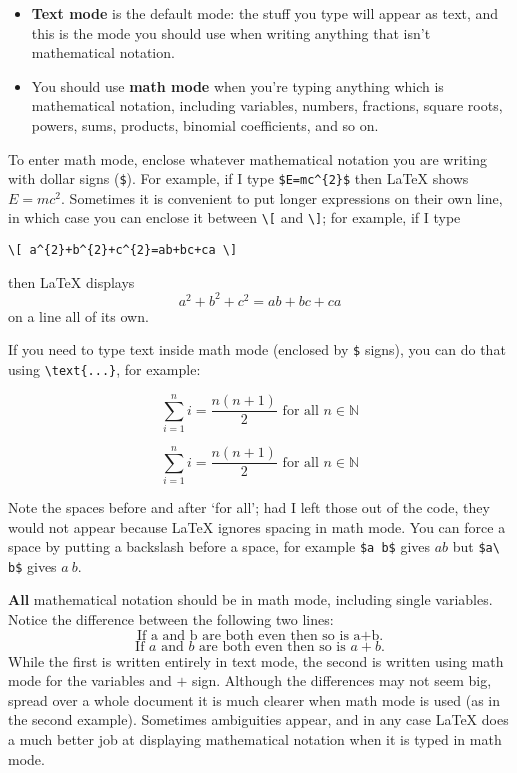 \begin{itemize}
\item \textbf{Text mode} is the default mode: the stuff you type will appear as text, and this is the mode you should use when writing anything that isn't mathematical notation.
\item You should use \textbf{math mode} when you're typing anything which is mathematical notation, including variables, numbers, fractions, square roots, powers, sums, products, binomial coefficients, and so on.
\end{itemize}

To enter math mode, enclose whatever mathematical notation you are writing with dollar signs (\texttt{\${}}). For example, if I type \lstinline|$E=mc^{2}$| then \LaTeX{} shows $E=mc^2$. Sometimes it is convenient to put longer expressions on their own line, in which case you can enclose it between \lstinline|\[| and \lstinline|\]|; for example, if I type
\begin{center}\lstinline|\[ a^{2}+b^{2}+c^{2}=ab+bc+ca \]|\end{center}
then \LaTeX{} displays \[ a^{2}+b^{2}+c^{2}=ab+bc+ca \] on a line all of its own.

If you need to type text inside math mode (enclosed by \texttt{\$} signs), you can do that using \lstinline|\text{...}|, for example:

\begin{texcodeleft}[1]
\[ \sum_{i=1}^n i = \frac{n(n+1)}{2} \text{ for all } n \in \mathbb{N} \]
\end{texcodeleft}

\begin{texcoderight}[1]
\[ \sum_{i=1}^n i = \frac{n(n+1)}{2} \text{ for all } n \in \mathbb{N} \]
\end{texcoderight}

Note the spaces before and after `for all'; had I left those out of the code, they would not appear because \LaTeX{} ignores spacing in math mode. You can force a space by putting a backslash before a space, for example \lstinline|$a b$| gives $a b$ but \lstinline|$a\ b$| gives $a\ b$.

\textbf{All} mathematical notation should be in math mode, including single variables. Notice the difference between the following two lines:
\[ \text{If a and b are both even then so is a+b.} \]
\[ \text{If } a \text{ and } b \text{ are both even then so is } a+b \text{.} \]
While the first is written entirely in text mode, the second is written using math mode for the variables and $+$ sign. Although the differences may not seem big, spread over a whole document it is much clearer when math mode is used (as in the second example). Sometimes ambiguities appear, and in any case \LaTeX{} does a much better job at displaying mathematical notation when it is typed in math mode.

